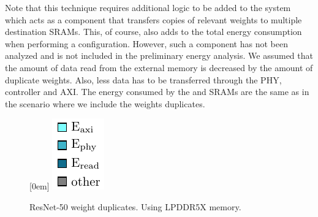 Note that this technique requires additional logic to be added to the system which acts as a component that transfers copies of relevant weights to multiple destination SRAMs.
This, of course, also adds to the total energy consumption when performing a configuration.
However, such a component has not been analyzed and is not included in the preliminary energy analysis. 
We assumed that the amount of data read from the external memory is decreased by the amount of duplicate weights.
Also, less data has to be transferred through the PHY, controller and AXI.
The energy consumed by the \confignoc{} and SRAMs are the same as in the scenario where we include the weights duplicates.

\begin{figure}[hbtp]
    \centering
    \hfill
    \subcaptionbox*{}[0em]{
        \includegraphics{assets/legend.pdf}
    }
    \hfill
    \caption{ResNet-50 weight duplicates. Using LPDDR5X memory.}
    \label{fig:resnet50_weight_duplicates}
\end{figure}